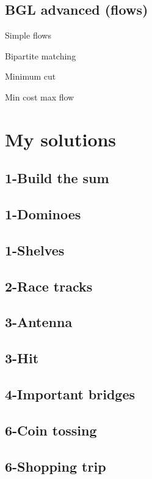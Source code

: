 \documentclass[a4paper,titlepage]{article}
\begin{document}
\subsection*{BGL advanced (flows)}
Simple flows

Bipartite matching

Minimum cut

Min cost max flow


\newpage\section{My solutions}

\subsection*{1-Build the sum}

\subsection*{1-Dominoes}

\subsection*{1-Shelves}

\subsection*{2-Race tracks}

\subsection*{3-Antenna}

\subsection*{3-Hit}

\subsection*{4-Important bridges}

\subsection*{6-Coin tossing}

\subsection*{6-Shopping trip}

\end{document}
